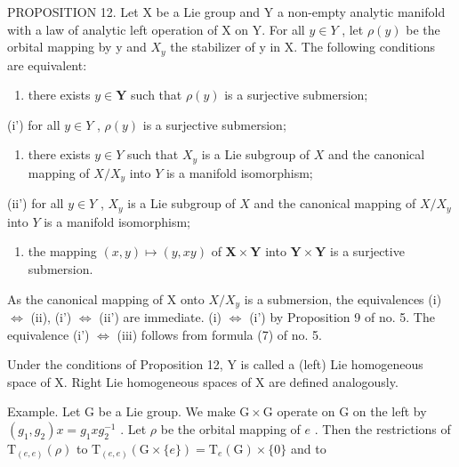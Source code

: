 PROPOSITION 12. Let X be a Lie group and Y a non-empty analytic manifold with a law of analytic left operation of X on Y. For all \(y \in Y\) , let \(\rho(y)\) be the orbital mapping by y and \(X_{y}\) the stabilizer of y in X. The following conditions are equivalent:

\begin{enumerate}
\def\labelenumi{(\roman{enumi})}
\tightlist
\item
  there exists \(y \in \mathbf{Y}\) such that \(\rho(y)\) is a surjective submersion;
\end{enumerate}

(i') for all \(y \in Y\) , \(\rho(y)\) is a surjective submersion;

\begin{enumerate}
\def\labelenumi{(\roman{enumi})}
\setcounter{enumi}{1}
\tightlist
\item
  there exists \(y \in Y\) such that \(X_y\) is a Lie subgroup of \(X\) and the canonical mapping of \(X / X_y\) into \(Y\) is a manifold isomorphism;
\end{enumerate}

(ii') for all \(y \in Y\) , \(X_y\) is a Lie subgroup of \(X\) and the canonical mapping of \(X / X_y\) into \(Y\) is a manifold isomorphism;

\begin{enumerate}
\def\labelenumi{(\roman{enumi})}
\setcounter{enumi}{2}
\tightlist
\item
  the mapping \((x,y)\mapsto (y,xy)\) of \(\mathbf{X}\times \mathbf{Y}\) into \(\mathbf{Y}\times \mathbf{Y}\) is a surjective submersion.
\end{enumerate}

As the canonical mapping of X onto \(X/X_{y}\) is a submersion, the equivalences (i) \(\Leftrightarrow\) (ii), (i') \(\Leftrightarrow\) (ii') are immediate. (i) \(\Leftrightarrow\) (i') by Proposition 9 of no. 5. The equivalence (i') \(\Leftrightarrow\) (iii) follows from formula (7) of no. 5.

Under the conditions of Proposition 12, Y is called a (left) Lie homogeneous space of X. Right Lie homogeneous spaces of X are defined analogously.

Example. Let \(\mathrm{G}\) be a Lie group. We make \(\mathrm{G} \times \mathrm{G}\) operate on \(\mathrm{G}\) on the left by \((g_1, g_2)x = g_1xg_2^{-1}\) . Let \(\rho\) be the orbital mapping of \(e\) . Then the restrictions of \(\mathrm{T}_{(e,e)}(\rho)\) to \(\mathrm{T}_{(e,e)}(\mathrm{G} \times \{e\}) = \mathrm{T}_e(\mathrm{G}) \times \{0\}\) and to

